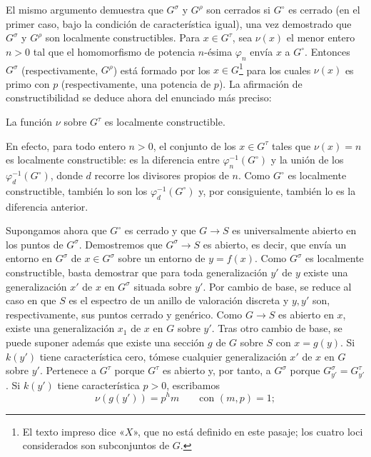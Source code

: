 El mismo argumento demuestra que $G^\sigma$ y $G^\rho$ son cerrados si
$G^\circ$ es cerrado (en el primer caso, bajo la condición de característica
igual), una vez demostrado que $G^\sigma$ y $G^\rho$ son localmente
constructibles. Para $x\in G^\tau$, sea $\nu(x)$ el menor entero $n>0$ tal que
el homomorfismo de potencia $n$-ésima $\varphi_n$ envía $x$ a $G^\circ$.
Entonces $G^\sigma$ (respectivamente, $G^\rho$) está formado por los
$x\in G$\footnote{El texto impreso dice «$X$», que no está definido en este
pasaje; los cuatro loci considerados son subconjuntos de $G$.} para los cuales
$\nu(x)$ es primo con $p$ (respectivamente, una potencia de $p$). La afirmación
de constructibilidad se deduce ahora del enunciado más preciso:

 La función $\nu$ sobre $G^\tau$ es localmente
constructible.

En efecto, para todo entero $n>0$, el conjunto de los $x\in G^\tau$ tales que
$\nu(x)=n$ es localmente constructible: es la diferencia entre
$\varphi_n^{-1}(G^\circ)$ y la unión de los
$\varphi_d^{-1}(G^\circ)$, donde $d$ recorre los divisores propios de $n$.
Como $G^\circ$ es localmente constructible, también lo son los
$\varphi_d^{-1}(G^\circ)$ y, por consiguiente, también lo es la diferencia
anterior.

Supongamos ahora que $G^\circ$ es cerrado y que $G\longrightarrow S$ es
universalmente abierto en los puntos de $G^\sigma$. Demostremos que
$G^\sigma\longrightarrow S$ es abierto, es decir, que envía un entorno en
$G^\sigma$ de $x\in G^\sigma$ sobre un entorno de $y=f(x)$. Como $G^\sigma$ es
localmente constructible, basta demostrar que para toda generalización $y'$ de
$y$ existe una generalización $x'$ de $x$ en $G^\sigma$ situada sobre $y'$.
Por cambio de base, se reduce al caso en que $S$ es el espectro de un anillo de
valoración discreta y $y,y'$ son, respectivamente, sus puntos cerrado y
genérico. Como $G\longrightarrow S$ es abierto en $x$, existe una
generalización $x_1$ de $x$ en $G$ sobre $y'$. Tras otro cambio de base, se
puede suponer además que existe una sección $g$ de $G$ sobre $S$ con
$x=g(y)$. Si $k(y')$ tiene característica cero, tómese cualquier
generalización $x'$ de $x$ en $G$ sobre $y'$. Pertenece a $G^\tau$ porque
$G^\tau$ es abierto y, por tanto, a $G^\sigma$ porque
$G_{y'}^\sigma=G_{y'}^\tau$. Si $k(y')$ tiene característica $p>0$, escribamos
\[
\nu(g(y'))=p^hm\qquad\text{con }(m,p)=1;
\]

